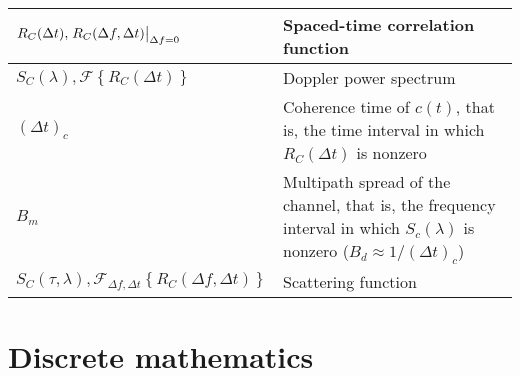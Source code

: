 \documentclass{article}
\begin{document}
\begin{xltabular}{\textwidth}{XX}
    \(R_C(\Delta t), \eval{R_C(\Delta f, \Delta t)}_{\Delta f = 0}\) & Spaced-time correlation function \\ \hline
    \(S_C(\lambda), \mathcal{F}\left\{ R_C (\Delta t) \right\}\) & Doppler power spectrum \\ \hline
    \((\Delta t)_c\) & Coherence time of \(c(t)\), that is, the time interval in which \(R_C(\Delta t)\) is nonzero \\ \hline
    \(B_m\) & Multipath spread of the channel, that is, the frequency interval in which \(S_c(\lambda)\) is nonzero (\(B_d \approx 1/(\Delta t)_c \)) \\ \hline
    \(S_C(\tau, \lambda), \mathcal{F}_{\Delta f, \Delta t}\left\{ R_C (\Delta f, \Delta t) \right\}\) & Scattering function \\ \hline
\end{xltabular}

\section{Discrete mathematics}
\end{document}
